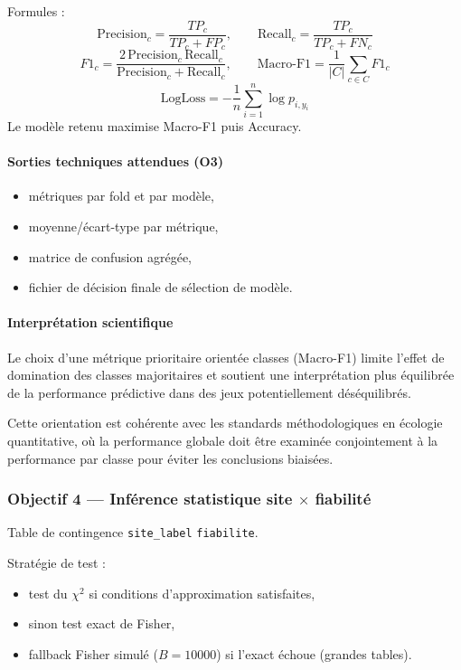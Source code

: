 \documentclass[11pt,a4paper]{article}
\begin{document}
Formules :
\[
\text{Precision}_c=\frac{TP_c}{TP_c+FP_c},
\qquad
\text{Recall}_c=\frac{TP_c}{TP_c+FN_c}
\]
\[
F1_c=\frac{2\,\text{Precision}_c\,\text{Recall}_c}{\text{Precision}_c+\text{Recall}_c},
\qquad
\text{Macro-F1}=\frac{1}{|C|}\sum_{c\in C}F1_c
\]
\[
\text{LogLoss}=-\frac{1}{n}\sum_{i=1}^{n}\log p_{i,y_i}
\]
Le modèle retenu maximise Macro-F1 puis Accuracy.

\paragraph{Sorties techniques attendues (O3)}
\begin{itemize}[leftmargin=1.2cm]
  \item métriques par fold et par modèle,
  \item moyenne/écart-type par métrique,
  \item matrice de confusion agrégée,
  \item fichier de décision finale de sélection de modèle.
\end{itemize}

\paragraph{Interprétation scientifique}
Le choix d'une métrique prioritaire orientée classes (Macro-F1) limite
l'effet de domination des classes majoritaires et soutient une interprétation
plus équilibrée de la performance prédictive dans des jeux potentiellement déséquilibrés.

Cette orientation est cohérente avec les standards méthodologiques
en écologie quantitative, où la performance globale doit être examinée
conjointement à la performance par classe pour éviter les conclusions biaisées.

\subsubsection{\texorpdfstring{Objectif 4 --- Inférence statistique site $\times$ fiabilité}{Objectif 4 --- Inférence statistique site x fiabilité}}
Table de contingence \texttt{site\_label} \texttimes{} \texttt{fiabilite}.

Stratégie de test :
\begin{itemize}[leftmargin=1.2cm]
  \item test du $\chi^2$ si conditions d'approximation satisfaites,
  \item sinon test exact de Fisher,
  \item fallback Fisher simulé ($B=10000$) si l'exact échoue (grandes tables).
\end{itemize}
\end{document}
